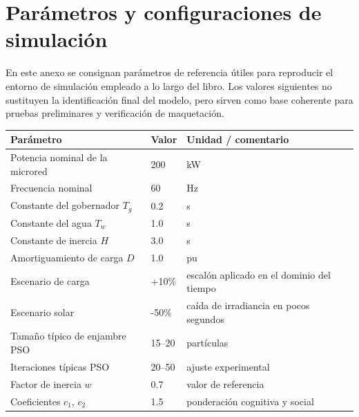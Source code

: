 \chapter{Parámetros y configuraciones de simulación}
\label{anx:parametros}

En este anexo se consignan parámetros de referencia útiles para reproducir el entorno de
simulación empleado a lo largo del libro. Los valores siguientes no sustituyen la identificación
final del modelo, pero sirven como base coherente para pruebas preliminares y verificación de
maquetación.

\begin{longtable}{p{}p{}p{}}
\toprule
\textbf{Parámetro} & \textbf{Valor} & \textbf{Unidad / comentario} \\
\midrule
Potencia nominal de la microred & 200 & kW \\
Frecuencia nominal & 60 & Hz \\
Constante del gobernador $T_g$ & 0.2 & s \\
Constante del agua $T_w$ & 1.0 & s \\
Constante de inercia $H$ & 3.0 & s \\
Amortiguamiento de carga $D$ & 1.0 & pu \\
Escenario de carga & +10\% & escalón aplicado en el dominio del tiempo \\
Escenario solar & -50\% & caída de irradiancia en pocos segundos \\
Tamaño típico de enjambre PSO & 15--20 & partículas \\
Iteraciones típicas PSO & 20--50 & ajuste experimental \\
Factor de inercia $w$ & 0.7 & valor de referencia \\
Coeficientes $c_1$, $c_2$ & 1.5 & ponderación cognitiva y social \\
\bottomrule
\end{longtable}
